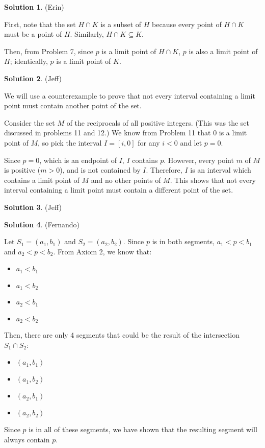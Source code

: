 \documentclass{article}
\theoremstyle{definition}
\newtheorem{solution}{Solution}
\begin{document}
\begin{solution} %
(Erin)

First, note that the set $H \cap K$ is a subset of $H$ because every point of $H \cap K$ must be a point of $H$.
Similarly, $H \cap K \subseteq K$.

Then, from Problem 7, since $p$ is a limit point of $H \cap K$, $p$ is also a limit point of $H$; identically, $p$ is a limit point of $K$.
\end{solution}

\begin{solution} %
(Jeff)

We will use a counterexample to prove that not every interval containing a limit point must contain another point of the set.

Consider the set $M$ of the reciprocals of all positive integers.
(This was the set discussed in problems 11 and 12.)
We know from Problem 11 that $0$ is a limit point of $M$, so pick the interval $I = [i, 0]$ for any $i < 0$ and let $p = 0$.

Since $p = 0$, which is an endpoint of $I$, $I$ contains $p$.
However, every point $m$ of $M$ is positive ($m > 0$), and is not contained by $I$.
Therefore, $I$ is an interval which contains a limit point of $M$ and no other points of $M$.
This shows that not every interval containing a limit point must contain a different point of the set.
\end{solution}

\begin{solution} %
(Jeff)
\end{solution}

\begin{solution} %
(Fernando)

Let $S_1 = (a_1, b_1)$ and $S_2 = (a_2, b_2)$.
Since $p$ is in both segments, $a_1 < p < b_1$ and $a_2 < p < b_2$.
From Axiom 2, we know that:

\begin{itemize}
\item $a_1 < b_1$
\item $a_1 < b_2$
\item $a_2 < b_1$
\item $a_2 < b_2$
\end{itemize}

Then, there are only 4 segments that could be the result of the intersection $S_1 \cap S_2$:

\begin{itemize}
\item $(a_1, b_1)$
\item $(a_1, b_2)$
\item $(a_2, b_1)$
\item $(a_2, b_2)$
\end{itemize}

Since $p$ is in all of these segments, we have shown that the resulting segment will always contain $p$.
\end{solution}
\end{document}
